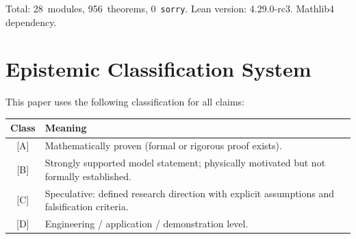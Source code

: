 \documentclass[11pt, a4paper]{article}
\theoremstyle{plain}
\theoremstyle{definition}
\theoremstyle{remark}
\begin{document}
\noindent Total: 28~modules, 956~theorems, 0~\texttt{sorry}.
Lean version: 4.29.0-rc3. Mathlib4 dependency.

\section{Epistemic Classification System}
\label{app:epistemic}

This paper uses the following classification for all claims:

\begin{center}
\begin{tabular}{@{}cp{10cm}@{}}
\toprule
Class & Meaning \\
\midrule
{[A]} & Mathematically proven (formal or rigorous proof exists). \\
{[B]} & Strongly supported model statement; physically motivated
    but not formally established. \\
{[C]} & Speculative: defined research direction with explicit
    assumptions and falsification criteria. \\
{[D]} & Engineering / application / demonstration level. \\
\bottomrule
\end{tabular}
\end{center}

\end{document}
